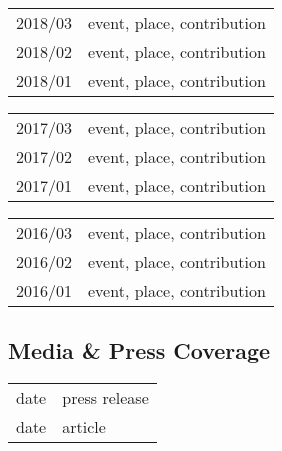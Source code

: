 \vspace{3mm}

\begin{tabular}{r l}
    2018/03 & event, place, contribution \\
    2018/02 & event, place, contribution \\
    2018/01 & event, place, contribution \\
\end{tabular}

\vspace{3mm}

\begin{tabular}{r l}
    2017/03 & event, place, contribution \\
    2017/02 & event, place, contribution \\
    2017/01 & event, place, contribution \\
\end{tabular}

\vspace{3mm}

\begin{tabular}{r l}
    2016/03 & event, place, contribution \\
    2016/02 & event, place, contribution \\
    2016/01 & event, place, contribution \\
\end{tabular}

\subsection{Media \& Press Coverage}

\begin{tabular}{rl}
    date & press release \\
    date & article \\
\end{tabular}
